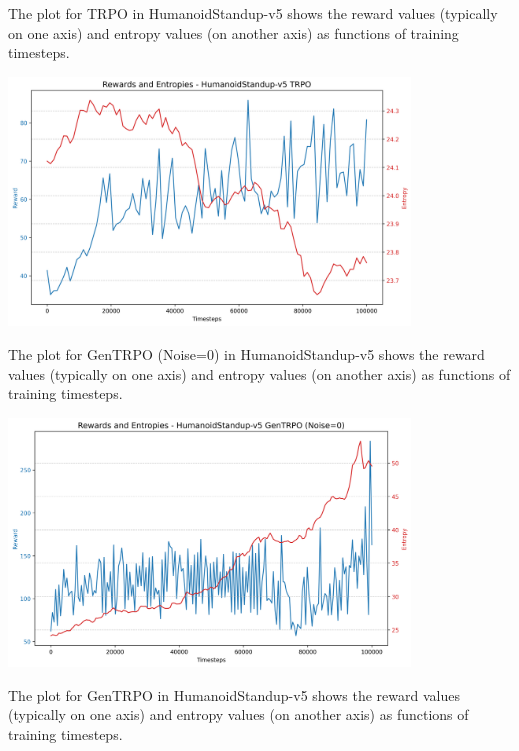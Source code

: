\documentclass{svproc}
\begin{document}
The plot for TRPO in HumanoidStandup-v5 shows the reward values (typically on one axis) and entropy values (on another axis) as functions of training timesteps.

\begin{center}
\includegraphics[width=0.8\textwidth]{graph_HumanoidStandup-v5_trpo_rewards_entropies.png}
\end{center}

The plot for GenTRPO (Noise=0) in HumanoidStandup-v5 shows the reward values (typically on one axis) and entropy values (on another axis) as functions of training timesteps.

\begin{center}
\includegraphics[width=0.8\textwidth]{graph_HumanoidStandup-v5_gentrpo_rewards_entropies.png}
\end{center}

The plot for GenTRPO in HumanoidStandup-v5 shows the reward values (typically on one axis) and entropy values (on another axis) as functions of training timesteps.
\end{document}
